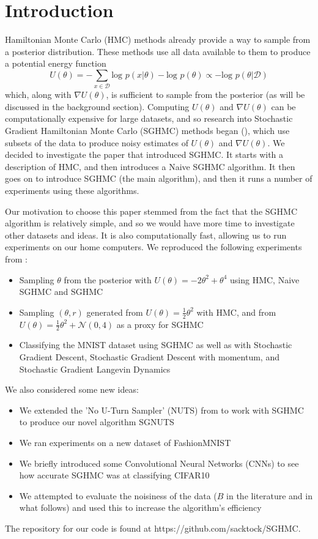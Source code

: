 
\section{Introduction}

Hamiltonian Monte Carlo (HMC) methods already provide a way to sample from a posterior distribution. These methods use all data available to them to produce a potential energy function $$U(\theta) = - \sum_{x\in\mathcal{D}}\text{log }p(x| \theta) - \text{log }p(\theta ) \propto -\text{log }p(\theta | \mathcal{D})$$
which, along with $\nabla U(\theta)$, is sufficient to sample from the posterior (as will be discussed in the background section). Computing $U(\theta)$ and $\nabla U(\theta)$ can be computationally expensive for large datasets, and so research into Stochastic Gradient Hamiltonian Monte Carlo (SGHMC) methods began (\cite{sghmc}), which use subsets of the data to produce noisy estimates of $U(\theta)$ and $\nabla U(\theta)$. We decided to investigate the paper that introduced SGHMC. It starts with a description of HMC, and then introduces a Naive SGHMC algorithm. It then goes on to introduce SGHMC (the main algorithm), and then it runs a number of experiments using these algorithms.

Our motivation to choose this paper stemmed from the fact that the SGHMC algorithm is relatively simple, and so we would have more time to investigate other datasets and ideas. It is also computationally fast, allowing us to run experiments on our home computers. We reproduced the following experiments from \cite{sghmc}:

\begin{itemize}
    \item Sampling $\theta$ from the posterior with $U(\theta) = -2\theta^2 + \theta^4$ using HMC, Naive SGHMC and SGHMC
    \item Sampling $(\theta,r)$ generated from $U(\theta) = \frac{1}{2}\theta^2$ with HMC, and from $U(\theta) = \frac{1}{2}\theta^2 + \mathcal{N}(0,4)$ as a proxy for SGHMC
    \item Classifying the MNIST dataset using SGHMC as well as with Stochastic Gradient Descent, Stochastic Gradient Descent with momentum, and Stochastic Gradient Langevin Dynamics
\end{itemize}

We also considered some new ideas:

\begin{itemize}
    \item We extended the 'No U-Turn Sampler' (NUTS) from \cite{nuts} to work with SGHMC to produce our novel algorithm SGNUTS
    \item We ran experiments on a new dataset of FashionMNIST
    \item We briefly introduced some Convolutional Neural Networks (CNNs) to see how accurate SGHMC was at classifying CIFAR10
    \item We attempted to evaluate the noisiness of the data ($B$ in the literature and in what follows) and used this to increase the algorithm's efficiency
\end{itemize}

The repository for our code is found at https://github.com/sacktock/SGHMC.
